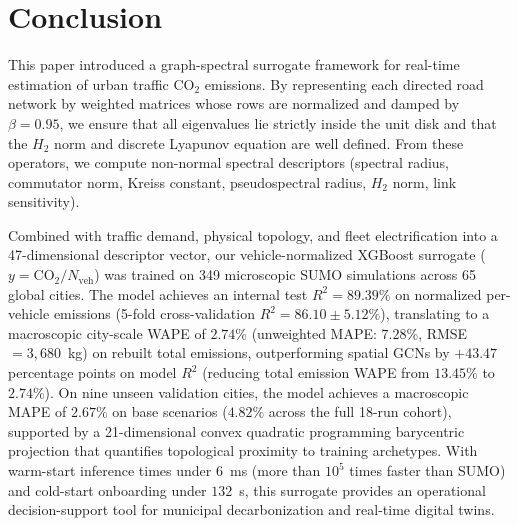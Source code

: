 \documentclass[journal]{IEEEtran}
\begin{document}
\section{Conclusion}

This paper introduced a graph-spectral surrogate framework for real-time estimation of urban traffic $\text{CO}_2$ emissions. By representing each directed road network by weighted matrices whose rows are normalized and damped by $\beta = 0.95$, we ensure that all eigenvalues lie strictly inside the unit disk and that the $H_2$ norm and discrete Lyapunov equation are well defined. From these operators, we compute non-normal spectral descriptors (spectral radius, commutator norm, Kreiss constant, pseudospectral radius, $H_2$ norm, link sensitivity).

Combined with traffic demand, physical topology, and fleet electrification into a 47-dimensional descriptor vector, our vehicle-normalized XGBoost surrogate ($y = \text{CO}_2 / N_{\text{veh}}$) was trained on 349 microscopic SUMO simulations across 65 global cities. The model achieves an internal test $R^2 = 89.39\%$ on normalized per-vehicle emissions (5-fold cross-validation $R^2 = 86.10 \pm 5.12\%$), translating to a macroscopic city-scale WAPE of $2.74\%$ (unweighted MAPE: $7.28\%$, RMSE $= 3,680$~kg) on rebuilt total emissions, outperforming spatial GCNs by $+43.47$ percentage points on model $R^2$ (reducing total emission WAPE from $13.45\%$ to $2.74\%$). On nine unseen validation cities, the model achieves a macroscopic MAPE of $2.67\%$ on base scenarios ($4.82\%$ across the full 18-run cohort), supported by a 21-dimensional convex quadratic programming barycentric projection \cite{Boyd2004} that quantifies topological proximity to training archetypes. With warm-start inference times under $6$~ms (more than $10^5$ times faster than SUMO) and cold-start onboarding under $132$~s, this surrogate provides an operational decision-support tool for municipal decarbonization and real-time digital twins.
\end{document}

